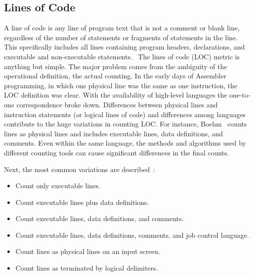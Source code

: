 \subsection{Lines of Code}
A line of code is any line of program text that is not a comment or blank line, 
regardless of the number of statements or fragments of statements in the line. 
This specifically includes all lines containing program headers, declarations, and executable and non-executable statements.~\cite{conte1986software}
The lines of code (LOC) metric is anything but simple. 
The major problem comes from the ambiguity of the operational definition, the actual counting.
In the early days of Assembler programming, in which one physical line was the same as one instruction, the LOC definition was clear.
With the availability of high-level languages the one-to-one correspondence broke down.
Differences between physical lines and instruction statements (or logical lines of code) 
and differences among languages contribute to the huge variations in counting LOC.
For instance, Boehm~\cite{boehm2009software} counts lines as physical lines and includes executable lines, data definitions, and comments. 
Even within the same language, the methods and algorithms used by different counting tools can cause significant differences in the final counts.

Next, the most common variations are described~\cite{jones1986programming}: 
\begin{itemize}
\item Count only executable lines. 
\item Count executable lines plus data definitions. 
\item Count executable lines, data definitions, and comments. 
\item Count executable lines, data definitions, comments, and job control language. 
\item Count lines as physical lines on an input screen. 
\item Count lines as terminated by logical delimiters. 
\end{itemize}


